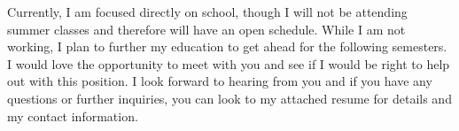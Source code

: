 \documentclass[11pt,a4paper,sans]{moderncv} %
\begin{document}
\hspace{1cm} Currently, I am focused directly on school, though I will not be attending summer classes and therefore will have an open schedule. While I am not working, I plan to further my education to get ahead for the following semesters. I would love the opportunity to meet with you and see if I would be right to help out with this position. I look forward to hearing from you and if you have any questions or further inquiries, you can look to my attached resume for details and my contact information.

\makeletterclosing %

\end{document}
